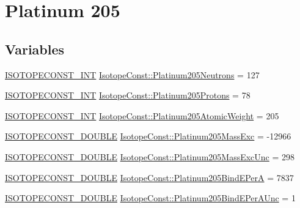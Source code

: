 \hypertarget{group___isotope_const-_platinum-_pt205}{}\section{Platinum 205}
\label{group___isotope_const-_platinum-_pt205}
\subsection*{Variables}
\begin{DoxyCompactItemize}
\item 
\mbox{\hyperlink{group___isotope_const-_macros_ga5f18360b3e99483a35c32d789e62621c}{I\+S\+O\+T\+O\+P\+E\+C\+O\+N\+S\+T\+\_\+\+I\+NT}} \mbox{\hyperlink{group___isotope_const-_platinum-_pt205_ga61bd201fa4530dfc5cb02b9d0871127c}{Isotope\+Const\+::\+Platinum205\+Neutrons}} = 127
\item 
\mbox{\hyperlink{group___isotope_const-_macros_ga5f18360b3e99483a35c32d789e62621c}{I\+S\+O\+T\+O\+P\+E\+C\+O\+N\+S\+T\+\_\+\+I\+NT}} \mbox{\hyperlink{group___isotope_const-_platinum-_pt205_gadf377ce1d450102812317c5c2b5be723}{Isotope\+Const\+::\+Platinum205\+Protons}} = 78
\item 
\mbox{\hyperlink{group___isotope_const-_macros_ga5f18360b3e99483a35c32d789e62621c}{I\+S\+O\+T\+O\+P\+E\+C\+O\+N\+S\+T\+\_\+\+I\+NT}} \mbox{\hyperlink{group___isotope_const-_platinum-_pt205_ga42a1e64b3eeabc93ee8e039b91cadd7e}{Isotope\+Const\+::\+Platinum205\+Atomic\+Weight}} = 205
\item 
\mbox{\hyperlink{group___isotope_const-_macros_ga8f45a7272ce02c0b4c65c44636ed719a}{I\+S\+O\+T\+O\+P\+E\+C\+O\+N\+S\+T\+\_\+\+D\+O\+U\+B\+LE}} \mbox{\hyperlink{group___isotope_const-_platinum-_pt205_ga134219e549712503743a5d71d5b8dda9}{Isotope\+Const\+::\+Platinum205\+Mass\+Exc}} = -\/12966
\item 
\mbox{\hyperlink{group___isotope_const-_macros_ga8f45a7272ce02c0b4c65c44636ed719a}{I\+S\+O\+T\+O\+P\+E\+C\+O\+N\+S\+T\+\_\+\+D\+O\+U\+B\+LE}} \mbox{\hyperlink{group___isotope_const-_platinum-_pt205_gaed78d4c2d619ff5ad45b26b3d846ade8}{Isotope\+Const\+::\+Platinum205\+Mass\+Exc\+Unc}} = 298
\item 
\mbox{\hyperlink{group___isotope_const-_macros_ga8f45a7272ce02c0b4c65c44636ed719a}{I\+S\+O\+T\+O\+P\+E\+C\+O\+N\+S\+T\+\_\+\+D\+O\+U\+B\+LE}} \mbox{\hyperlink{group___isotope_const-_platinum-_pt205_gab7da7d7ee4fc9c79e65346c69ca3223f}{Isotope\+Const\+::\+Platinum205\+Bind\+E\+PerA}} = 7837
\item 
\mbox{\hyperlink{group___isotope_const-_macros_ga8f45a7272ce02c0b4c65c44636ed719a}{I\+S\+O\+T\+O\+P\+E\+C\+O\+N\+S\+T\+\_\+\+D\+O\+U\+B\+LE}} \mbox{\hyperlink{group___isotope_const-_platinum-_pt205_ga64631239a4fc1356f31c17b286ffab4b}{Isotope\+Const\+::\+Platinum205\+Bind\+E\+Per\+A\+Unc}} = 1

\end{DoxyCompactItemize}
